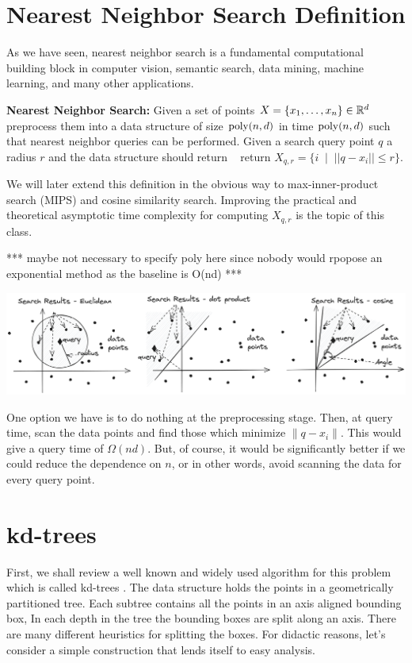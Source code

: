 \documentclass{article}
\begin{document}
\section{Nearest Neighbor Search Definition}

As we have seen, nearest neighbor search is a fundamental computational building block in computer vision, semantic search, data mining, machine learning, and many other applications.

\begin{definition}{\bf Nearest Neighbor Search:} Given a set of points $X = \{x_1,\ldots,x_n\} \in {\mathbb{R}}^{d}$ 
preprocess them into a data structure of size ${\operatorname{poly}}(n,d)$ in time ${\operatorname{poly}}(n,d)$ such that nearest neighbor queries can
be performed. Given a search query point $q$ a radius $r$ and the data structure should return  
return $X_{q,r} = \{i \;\; | \;\; ||q - x_i || \le r \}$. 
\end{definition}
We will later extend this definition in the obvious way to max-inner-product search (MIPS) and cosine similarity search.
Improving the practical and theoretical asymptotic time complexity for computing $X_{q,r}$ is the topic of this class.

*** maybe not necessary to specify poly here since nobody would rpopose an exponential method as the baseline is O(nd) *** 

\begin{center}
\includegraphics[width=1.0\textwidth]{images/vectorsearch.png}
\end{center}

One option we have is to do nothing at the preprocessing stage. Then, at query time, scan the data points and find those which minimize $\|q - x_i\|$.
This would give a query time of $\Omega(nd)$. But, of course, it would be significantly better if we could reduce the dependence on $n$, or in other words, avoid scanning the data for every query point.

\section{kd-trees}
First, we shall review a well known and widely used algorithm for this problem which is called kd-trees \cite{Bentley75}.
The data structure holds the points in a geometrically partitioned tree. 
Each subtree contains all the points in an axis aligned bounding box,
In each depth in the tree the bounding boxes are split along an axis.
There are many different heuristics for splitting the boxes. For didactic reasons, let's consider a simple construction that lends itself to easy analysis.
\end{document}
